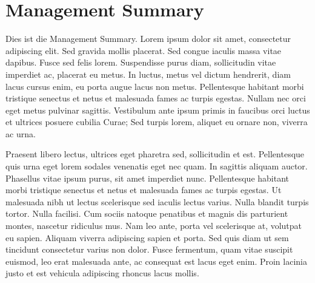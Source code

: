 \chapter*{Management Summary}

Dies ist die Management Summary. Lorem ipsum dolor sit amet, consectetur adipiscing elit. Sed gravida mollis placerat. Sed congue iaculis massa vitae dapibus. Fusce sed felis lorem. Suspendisse purus diam, sollicitudin vitae imperdiet ac, placerat eu metus. In luctus, metus vel dictum hendrerit, diam lacus cursus enim, eu porta augue lacus non metus. Pellentesque habitant morbi tristique senectus et netus et malesuada fames ac turpis egestas. Nullam nec orci eget metus pulvinar sagittis. Vestibulum ante ipsum primis in faucibus orci luctus et ultrices posuere cubilia Curae; Sed turpis lorem, aliquet eu ornare non, viverra ac urna.

Praesent libero lectus, ultrices eget pharetra sed, sollicitudin et est. Pellentesque quis urna eget lorem sodales venenatis eget nec quam. In sagittis aliquam auctor. Phasellus vitae ipsum purus, sit amet imperdiet nunc. Pellentesque habitant morbi tristique senectus et netus et malesuada fames ac turpis egestas. Ut malesuada nibh ut lectus scelerisque sed iaculis lectus varius. Nulla blandit turpis tortor. Nulla facilisi. Cum sociis natoque penatibus et magnis dis parturient montes, nascetur ridiculus mus. Nam leo ante, porta vel scelerisque at, volutpat eu sapien. Aliquam viverra adipiscing sapien et porta. Sed quis diam ut sem tincidunt consectetur varius non dolor. Fusce fermentum, quam vitae suscipit euismod, leo erat malesuada ante, ac consequat est lacus eget enim. Proin lacinia justo et est vehicula adipiscing rhoncus lacus mollis.	
